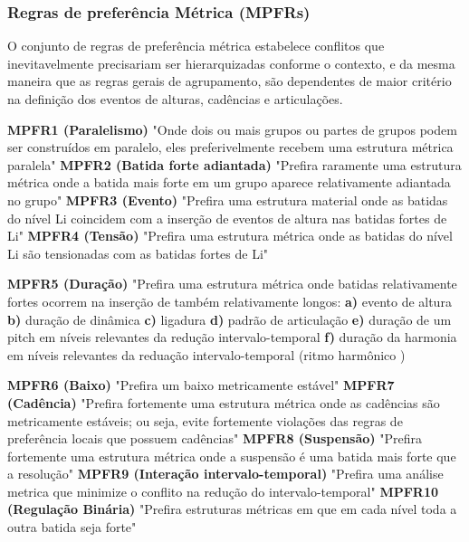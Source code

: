 \documentclass[
	12pt,				%
	openright,			%
	twoside,			%
	a4paper,			%
	english,			%
	french,				%
	spanish,			%
	brazil				%
	]{abntex2}
\begin{document}
\subsubsection{Regras de preferência Métrica (MPFRs) } 

O conjunto de regras de preferência métrica estabelece conflitos que inevitavelmente precisariam ser hierarquizadas conforme o contexto, e da mesma maneira que as regras gerais de agrupamento, são dependentes de maior critério na definição dos eventos de alturas, cadências e articulações.

\begin{citacao}
\textbf{MPFR1 (Paralelismo) }"Onde dois ou mais grupos ou partes de grupos podem ser construídos em paralelo, eles preferivelmente recebem uma estrutura métrica paralela" 
\textbf{MPFR2 (Batida forte adiantada)} "Prefira raramente uma estrutura métrica onde a batida mais forte em um grupo aparece relativamente adiantada no grupo" 
\textbf{MPFR3 (Evento)} "Prefira uma estrutura material onde as batidas do nível Li coincidem com a inserção de eventos de altura nas batidas fortes de Li" 
\textbf{MPFR4 (Tensão)} "Prefira uma estrutura métrica onde as batidas do nível Li são tensionadas com as batidas fortes de Li" 
\end{citacao}

\begin{citacao}
\textbf{MPFR5 (Duração)} "Prefira uma estrutura métrica onde batidas relativamente fortes ocorrem na inserção de também relativamente longos: 
\textbf{a)} evento de altura 
\textbf{b)} duração de dinâmica 
\textbf{c)} ligadura 
\textbf{d)} padrão de articulação 
\textbf{e)} duração de um pitch em níveis relevantes da redução intervalo-temporal 
\textbf{f)} duração da harmonia em níveis relevantes  da reduação intervalo-temporal (ritmo harmônico )
\end{citacao}

\begin{citacao}
\textbf{MPFR6 (Baixo)} "Prefira um baixo metricamente estável" 
\textbf{MPFR7 (Cadência)} "Prefira fortemente uma estrutura métrica onde as cadências são metricamente estáveis; ou seja, evite fortemente violações das regras de preferência locais que possuem cadências" 
\textbf{MPFR8 (Suspensão)} "Prefira fortemente uma estrutura métrica onde a suspensão é uma batida mais forte que a resolução" 
\textbf{MPFR9 (Interação intervalo-temporal)} "Prefira uma análise metrica que minimize o conflito na redução do intervalo-temporal" 
\textbf{MPFR10 (Regulação Binária)} "Prefira estruturas métricas em que em cada nível toda a outra batida seja forte" 
 \cite{lerdahl1983generative}
\end{citacao}
\end{document}
